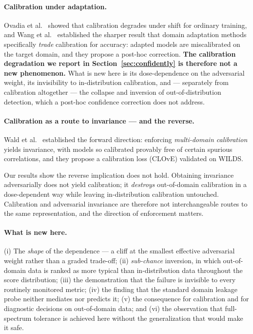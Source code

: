 \documentclass[11pt,a4paper]{article}
\begin{document}
\paragraph{Calibration under adaptation.}
Ovadia et al.~\cite{ovadia2019} showed that calibration degrades under shift for
ordinary training, and Wang et al.~\cite{wang2020} established the sharper result that
domain adaptation methods specifically \emph{trade} calibration for accuracy: adapted
models are miscalibrated on the target domain, and they propose a post-hoc correction.
\textbf{The calibration degradation we report in Section~\ref{sec:confidently} is
therefore not a new phenomenon.} What is new here is its dose-dependence on the
adversarial weight, its invisibility to in-distribution calibration, and --- separately
from calibration altogether --- the collapse and inversion of out-of-distribution
detection, which a post-hoc confidence correction does not address. \paragraph{Calibration as a route to invariance --- and the reverse.}
Wald et al.~\cite{wald2021} established the forward direction: enforcing \emph{multi-domain calibration}
yields invariance, with models so calibrated provably free of certain spurious
correlations, and they propose a calibration loss (CLOvE) validated on WILDS.

Our results show the reverse implication does not hold. Obtaining invariance
adversarially does not yield calibration; it \emph{destroys} out-of-domain
calibration in a dose-dependent way while leaving in-distribution calibration
untouched. Calibration and adversarial invariance are therefore not
interchangeable routes to the same representation, and the direction of
enforcement matters.

\paragraph{What is new here.}
(i) The \emph{shape} of the dependence --- a cliff at the smallest effective
adversarial weight rather than a graded trade-off; (ii) \emph{sub-chance}
inversion, in which out-of-domain data is ranked as more typical than
in-distribution data throughout the score distribution; (iii) the
demonstration that the failure is invisible to every routinely monitored
metric; (iv) the finding that the standard domain leakage probe neither
mediates nor predicts it; (v) the consequence for calibration and for
diagnostic decisions on out-of-domain data; and (vi) the observation that
full-spectrum tolerance is achieved here without the generalization that would
make it safe.
\end{document}

